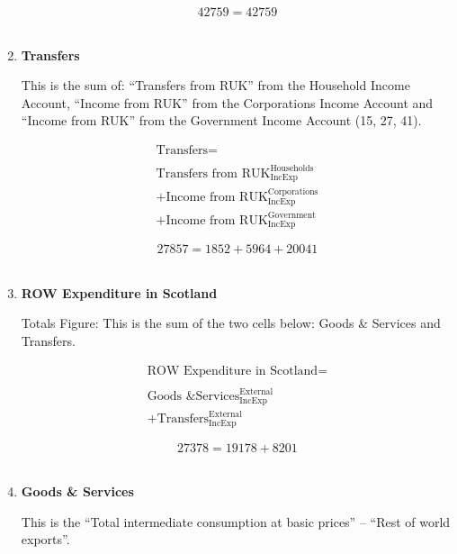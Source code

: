 \begin{enumerate}
\begin{equation} \nonumber
42759 = 42759
\end{equation}\\


\item \textbf {Transfers}

This is the sum of: “Transfers from RUK” from the Household Income Account, “Income from RUK” from the Corporations Income Account and “Income from RUK” from the Government Income Account (15, 27, 41).

\begin{equation}
\begin{split}
\text{Transfers} =  \\ \\
\text{Transfers from RUK}^\text{Households}_\text{IncExp}\\
+\text{Income from RUK}^\text{Corporations}_\text{IncExp}\\
+\text{Income from RUK}^\text{Government}_\text{IncExp}
\end{split} \label{eq:2.5.64}
\end{equation}

\begin{equation} \nonumber
27857 = 1852+5964+20041
\end{equation}\\


\item \textbf {ROW Expenditure in Scotland}

Totals Figure: This is the sum of the two cells below: Goods \& Services and Transfers.

\begin{equation}
\begin{split}
\text{ROW Expenditure in Scotland} =  \\ \\
\text{Goods \& Services}^\text{External}_\text{IncExp}\\
+\text{Transfers}^\text{External}_\text{IncExp}
\end{split} \label{eq:2.5.65}
\end{equation}

\begin{equation} \nonumber
27378 = 19178+8201
\end{equation}\\


\item \textbf {Goods \& Services}

This is the “Total intermediate consumption at basic prices” – “Rest of world exports”. \cite{ScotGov2013a}


\end{enumerate}
